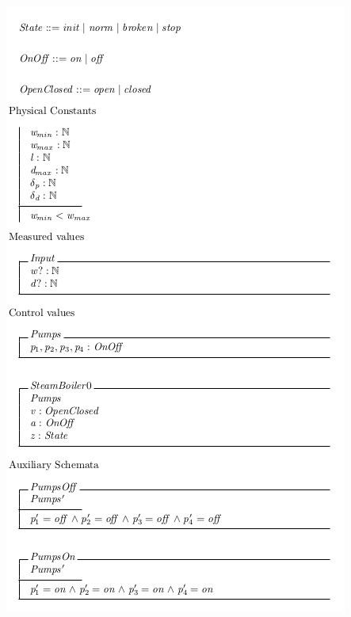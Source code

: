 \begin{center}
    \noindent \includegraphics[scale=0.8]{examples/steamboiler/0a.png}
\end{center}


